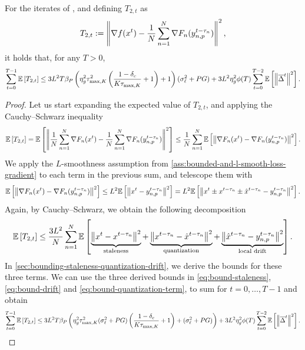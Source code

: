 \begin{lemma}
    \label{lemma:expected-t2}
    For the iterates of \algname{}, and defining $T_{2,t}$ as
    \begin{equation*}
        T_{2,t} := \left\lVert\nabla f(x^t) - \frac{1}{N}\sum_{n = 1}^N \nabla F_n(y^{t-\tau_n}_{n,p})\right\rVert^2,
    \end{equation*}
    it holds that, for any $T > 0$,
    \begin{equation}
        \sum_{t=0}^{T-1} \mathbb{E}\left[T_{2,t}\right] \leq 3 L^2 T \beta_P \left( \eta^2_g \tau_{\max,K}^2 \left (\frac{1-\delta_c}{K \tau_{\max, K}} + 1 \right) + 1\right)  (\sigma_{\ell}^2 + PG) + 3L^2 \eta_g^2 \phi(T) \sum_{t=0}^{T-2} \mathbb{E}\left[\left\lVert\overline{\Delta}^t\right\rVert^2\right].
    \end{equation}
\end{lemma}
\begin{proof}
    Let us start expanding the expected value of $T_{2,t}$, and applying the Cauchy–Schwarz inequality
    \begin{equation}
        \mathbb{E}\left[T_{2,t}\right] = \mathbb{E}\left[\left\lVert \frac{1}{N}\sum_{n = 1}^N  \nabla F_n(x^t) - \frac{1}{N} \sum_{n = 1}^N \nabla F_n(y^{t-\tau_n}_{n,p})\right\rVert^2\right] \leq \frac{1}{N} \sum_{n = 1}^N \mathbb{E}\left[\left\lVert\nabla F_n(x^t) - \nabla F_n(y^{t-\tau_n}_{n,p})\right\rVert^2\right].
    \end{equation}
    We apply the $L$-smoothness assumption from \cref{ass:bounded-and-l-smooth-loss-gradient} to each term in the previous sum, and telescope them with
    \begin{equation}
        \mathbb{E}\left[\left\lVert\nabla F_n(x^t) - \nabla F_n(y^{t-\tau_n}_{n,p})\right\rVert^2\right] \leq L^2 \mathbb{E}\left[\left\lVert x^t -y^{t-\tau_n}_{n,p}\right\rVert^2\right] = L^2 \mathbb{E}\left[\left\lVert x^t \pm x^{t - \tau_n} \pm \hat x^{t - \tau_n} -y^{t-\tau_n}_{n,p}\right\rVert^2\right].
    \end{equation}
    Again, by Cauchy–Schwarz, we obtain the following decomposition
    \begin{equation}
        \mathbb{E}\left[T_{2,t}\right] \leq \frac{3L^2}{N}\sum_{n = 1}^N \mathbb{E}\left[ \underbrace{\left\lVert x^t - x^{t-\tau_n} \right\rVert^2}_{\text{staleness}} + \underbrace{\left\lVert x^{t-\tau_n} - \hat x^{t-\tau_n} \right\rVert^2}_{\text{quantization}} + \underbrace{\left\lVert\hat x^{t-\tau_n} - y^{t-\tau_n}_{n,p} \right\rVert^2}_{\text{local drift}} \right].
    \end{equation}
    In \cref{sec:bounding-staleness-quantization-drift}, we derive the bounds for these three terms.
    We can use the three derived bounds in \eqref{eq:bound-staleness}, \eqref{eq:bound-drift} and \eqref{eq:bound-quantization-term}, to sum for $t=0, \ldots, T-1$ and obtain
    \begin{equation}
        \sum_{t=0}^{T-1} \mathbb{E}\left[T_{2,t}\right] \leq 3 L^2 T \beta_P \left(\eta^2_g \tau_{\max,K}^2   (\sigma_{\ell}^2 + PG) \left (\frac{1-\delta_c}{K \tau_{\max, K}} + 1 \right) + ( \sigma_{\ell}^2 + PG ) \right) + 3L^2 \eta_g^2 \phi(T) \sum_{t=0}^{T-2} \mathbb{E}\left[\left\lVert\overline{\Delta}^t\right\rVert^2\right].
    \end{equation}
\end{proof}

